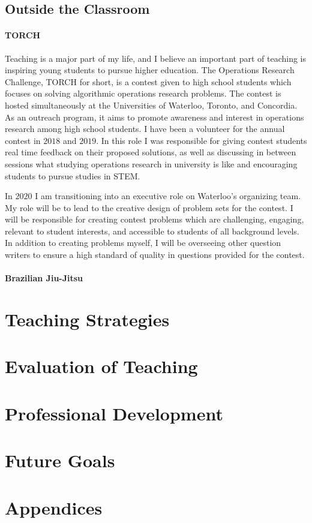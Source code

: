 \documentclass{article}
\begin{document}
\subsection{Outside the Classroom}
\paragraph{TORCH}Teaching is a major part of my life, and I believe an important part of teaching is inspiring young students to pursue higher education. The Operations Research Challenge, TORCH for short, is a contest given to high school students which focuses on solving algorithmic operations research problems. The contest is hosted simultaneously at the Universities of Waterloo, Toronto, and Concordia. As an outreach program, it aims to promote awareness and interest in operations research among high school students. I have been a volunteer for the annual contest in $2018$ and $2019$. In this role I was responsible for giving contest students real time feedback on their proposed solutions, as well as discussing in between sessions what studying operations research in university is like and encouraging students to pursue studies in STEM.

In $2020$ I am transitioning into an executive role on Waterloo's organizing team. My role will be to lead to the creative design of problem sets for the contest. I will be responsible for creating contest problems which are challenging, engaging, relevant to student interests, and accessible to students of all background levels. In addition to creating problems myself, I will be overseeing other question writers to ensure a high standard of quality in questions provided for the contest.

\paragraph{Brazilian Jiu-Jitsu}
\section{Teaching Strategies}

\section{Evaluation of Teaching}

\section{Professional Development}

\section{Future Goals}


\appendix
\section*{Appendices}
\section{}
\end{document}
